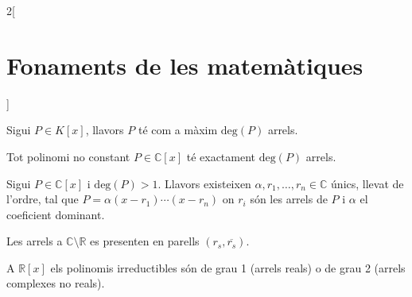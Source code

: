 \documentclass[../../../main.tex]{subfiles}
\begin{document}
\begin{multicols}{2}[\section{Fonaments de les matemàtiques}]
\begin{definition}
\end{definition}
\begin{theorem}
Sigui $P\in K[x]$, llavors $P$ té com a màxim $\text{deg}(P)$ arrels.
\end{theorem}
\begin{theorem}
Tot polinomi no constant $P\in\mathbb{C}[x]$ té exactament $\text{deg}(P)$ arrels.
\end{theorem}
\begin{corollary}
Sigui $P\in\mathbb{C}[x]$ i $\text{deg}(P)>1$. Llavors existeixen $\alpha,r_1,\ldots,r_n\in\mathbb{C}$ únics, llevat de l'ordre, tal que $P=\alpha(x-r_1)\cdots(x-r_n)$ on $r_i$ són les arrels de $P$ i $\alpha$ el coeficient dominant.
\end{corollary}
\begin{corollary}
Les arrels a $\mathbb{C}\setminus\mathbb{R}$ es presenten en parells $(r_s,\overline{r_s})$.
\end{corollary}
\begin{theorem}
A $\mathbb{R}[x]$ els polinomis irreductibles són de grau 1 (arrels reals) o de grau 2 (arrels complexes no reals).
\end{theorem}
\end{multicols}
\end{document}

